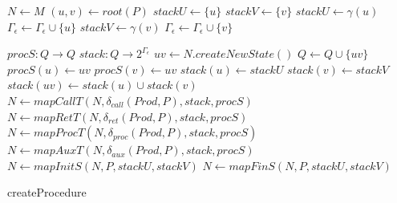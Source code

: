         \begin{algorithm}
            \footnotesize
            \DontPrintSemicolon
            \setcounter{AlgoLine}{0}

            \vspace*{1em}
            $N \leftarrow M$\;
            $(u, v) \leftarrow root(P)$\;
            $stackU \leftarrow \{u\}$\;
            $stackV \leftarrow \{v\}$\;
            {
                $stackU \leftarrow \gamma(u)$\;
            }\Else
            {
                $\Gamma_\epsilon \leftarrow \Gamma_\epsilon \cup \{u\}$\;
            }
            {
                $stackV \leftarrow \gamma(v)$\;
            }\Else
            {
                $\Gamma_\epsilon \leftarrow \Gamma_\epsilon \cup \{v\}$\;
            }

            \vspace*{1em}

            $procS: Q \rightarrow Q$\;
            $stack: Q \rightarrow 2^{\Gamma_\epsilon}$\;
            {
                $uv \leftarrow N.\textit{createNewState}()$\;
                $Q \leftarrow Q \cup \{uv\}$\;
                $procS(u) \leftarrow uv$\;
                $procS(v) \leftarrow uv$\;
                $stack(u) \leftarrow  stackU$\;
                $stack(v) \leftarrow stackV$\;
                $stack(uv) \leftarrow stack(u) \cup stack(v)$\;
            }
            $N \leftarrow \textit{mapCallT}(N, \delta_{call}(Prod, P), stack, procS)$\;
            $N \leftarrow \textit{mapRetT}(N, \delta_{ret}(Prod, P), stack, procS)$\;
            $N \leftarrow \textit{mapProcT}(N, \delta_{proc}(Prod, P),stack, procS)$\;
            $N \leftarrow \textit{mapAuxT}(N, \delta_{aux}(Prod, P), stack, procS)$\;
            $N \leftarrow \textit{mapInitS}(N, P, stackU, stackV)$\;
            $N \leftarrow \textit{mapFinS}(N, P, stackU, stackV)$\;


            \normalsize
            \caption{createProcedure}
        \end{algorithm}

